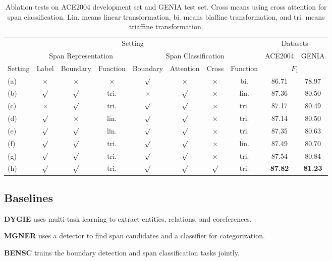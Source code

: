 \documentclass[11pt]{article}
\begin{document}
\begin{table*}[ht]
\small
\centering
\begin{tabular}{lccccccccc}
\toprule
\multicolumn{8}{c}{Setting} & \multicolumn{2}{c}{Datasets} \\

&\multicolumn{3}{c}{Span Representation} & \multicolumn{4}{c}{Span Classification} & ACE2004 & GENIA \\
Setting &Label & Boundary & Function & Boundary & Attention & Cross & Function & \multicolumn{2}{c}{$F_1$}\\
\hline
(a)&$\times$ & $\times$ & $\times$ &  $\surd$ & $\times$ & $\times$ & bi. & 86.71  & 78.97 \\
(b)&$\surd$ & $\surd$ & tri. & $\times$ & $\surd$ & $\times$ & lin. & 87.36 & 80.50   \\
(c)&$\times$ & $\surd$ & tri. & $\surd$ & $\surd$ & $\times$ & tri. & 87.17  & 80.49   \\
(d)&$\surd$ & $\times$ & lin. & $\surd$ & $\surd$ & $\times$ & tri. & 87.14 & 80.50  \\
(e)&$\surd$ & $\surd$  & lin. & $\surd$ & $\surd$ & $\times$ & tri. & 87.35  & 80.63 \\
(f)&$\surd$ & $\surd$ & tri. & $\surd$ & $\surd$ & $\times$ & lin. & 87.49  & 80.70 \\
(g)&$\surd$ & $\surd$ & tri. & $\surd$ & $\surd$ & $\times$ & tri. & 87.54& 80.84\\
(h)&$\surd$ & $\surd$ & tri. & $\surd$ & $\surd$ & $\surd$ & tri. & \textbf{87.82} & \textbf{81.23} \\
\bottomrule
\end{tabular}
\caption{Ablation tests on ACE2004 development set and GENIA test set. Cross means using cross attention for span classification.
Lin. means linear transformation, bi. means biaffine transformation, and tri. means triaffine transformation.}
\label{main ablation}
\end{table*}

\subsection{Baselines}


\noindent\textbf{DYGIE} \cite{dygie} uses multi-task learning to extract entities, relations, and coreferences.

\noindent\textbf{MGNER} \cite{mgner} uses a detector to find span candidates and a classifier for categorization.

\noindent\textbf{BENSC} \cite{bensc} trains the boundary detection and span classification tasks jointly.
\end{document}
